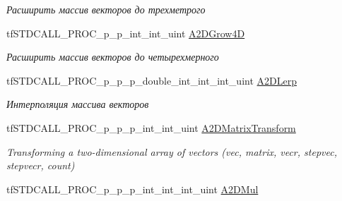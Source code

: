 \begin{DoxyCompactItemize}
\begin{DoxyCompactList}\small\item\em Расширить массив векторов до трехметрого \end{DoxyCompactList}\item 
\hypertarget{structs_functions_array_vector_c_p_u_a7a17d227697da4b2aafbacf3b1ac6e63}{tf\-S\-T\-D\-C\-A\-L\-L\-\_\-\-P\-R\-O\-C\-\_\-p\-\_\-p\-\_\-int\-\_\-int\-\_\-uint \hyperlink{structs_functions_array_vector_c_p_u_a7a17d227697da4b2aafbacf3b1ac6e63}{A2\-D\-Grow4\-D}}\label{structs_functions_array_vector_c_p_u_a7a17d227697da4b2aafbacf3b1ac6e63}

\begin{DoxyCompactList}\small\item\em Расширить массив векторов до четырехмерного \end{DoxyCompactList}\item 
\hypertarget{structs_functions_array_vector_c_p_u_a028c77911600ee14e47494ad33b11a18}{tf\-S\-T\-D\-C\-A\-L\-L\-\_\-\-P\-R\-O\-C\-\_\-p\-\_\-p\-\_\-p\-\_\-double\-\_\-int\-\_\-int\-\_\-int\-\_\-uint \hyperlink{structs_functions_array_vector_c_p_u_a028c77911600ee14e47494ad33b11a18}{A2\-D\-Lerp}}\label{structs_functions_array_vector_c_p_u_a028c77911600ee14e47494ad33b11a18}

\begin{DoxyCompactList}\small\item\em Интерполяция массива векторов \end{DoxyCompactList}\item 
\hypertarget{structs_functions_array_vector_c_p_u_a98e3256cbf28d575fb2e98bf6454c11c}{tf\-S\-T\-D\-C\-A\-L\-L\-\_\-\-P\-R\-O\-C\-\_\-p\-\_\-p\-\_\-p\-\_\-int\-\_\-int\-\_\-uint \hyperlink{structs_functions_array_vector_c_p_u_a98e3256cbf28d575fb2e98bf6454c11c}{A2\-D\-Matrix\-Transform}}\label{structs_functions_array_vector_c_p_u_a98e3256cbf28d575fb2e98bf6454c11c}

\begin{DoxyCompactList}\small\item\em Transforming a two-\/dimensional array of vectors (vec, matrix, vecr, stepvec, stepvecr, count) \end{DoxyCompactList}\item 
\hypertarget{structs_functions_array_vector_c_p_u_ae042014a840e9561cd8cc6d7962940a8}{tf\-S\-T\-D\-C\-A\-L\-L\-\_\-\-P\-R\-O\-C\-\_\-p\-\_\-p\-\_\-p\-\_\-int\-\_\-int\-\_\-int\-\_\-uint \hyperlink{structs_functions_array_vector_c_p_u_ae042014a840e9561cd8cc6d7962940a8}{A2\-D\-Mul}}\label{structs_functions_array_vector_c_p_u_ae042014a840e9561cd8cc6d7962940a8}


\end{DoxyCompactItemize}
